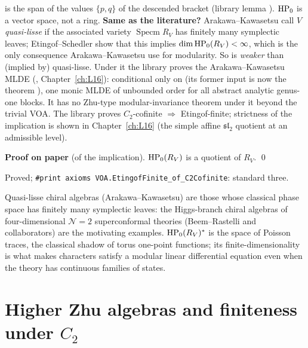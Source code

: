 \begin{dictionary}
 is the span of the values $\{p,q\}$ of the descended bracket (library lemma
). $\mathrm{HP}_0$ is a vector space, not a ring. \textbf{Same as the literature?}
Arakawa--Kawasetsu call $V$ \emph{quasi-lisse} if the associated variety $\operatorname{Specm}R_V$ has finitely many
symplectic leaves; Etingof--Schedler show that this implies $\dim\mathrm{HP}_0(R_V)<\infty$, which is the only consequence
Arakawa--Kawasetsu use for modularity. So  is \emph{weaker} than (implied by) quasi-lisse. Under it
the library proves the Arakawa--Kawasetsu MLDE
(\allowbreak{}\allowbreak{}\allowbreak{}\allowbreak{}\allowbreak{}\allowbreak{},
Chapter~\ref{ch:L16}): conditional only on  (its former input  is now the theorem
), one monic MLDE of unbounded order for all abstract analytic genus-one blocks. It has no Zhu-type
modular-invariance theorem under it beyond the trivial VOA. The library proves
$C_2$-cofinite $\Rightarrow$ Etingof-finite; strictness of the implication is shown in Chapter~\ref{ch:L16} (the
simple affine $\mathfrak{sl}_2$ quotient at an admissible level).
\end{dictionary}

\textbf{Proof on paper} (of the implication). $\mathrm{HP}_0(R_V)$ is a quotient of $R_V$. \qed

\begin{status}
Proved; \texttt{\#print axioms VOA.EtingofFinite\_of\_C2Cofinite}: standard three.
\end{status}

\begin{physics}
Quasi-lisse chiral algebras (Arakawa--Kawasetsu) are those whose classical phase space has finitely many
symplectic leaves: the Higgs-branch chiral algebras of four-dimensional $\mathcal N=2$ superconformal theories
(Beem--Rastelli and collaborators) are the motivating examples. $\mathrm{HP}_0(R_V)^*$ is the space of Poisson traces,
the classical shadow of torus one-point functions; its finite-dimensionality is what makes characters satisfy a
modular linear differential equation even when the theory has continuous families of states.
\end{physics}

\section{Higher Zhu algebras and finiteness under \texorpdfstring{$C_2$}{C2}}\label{l12:sec:an}


